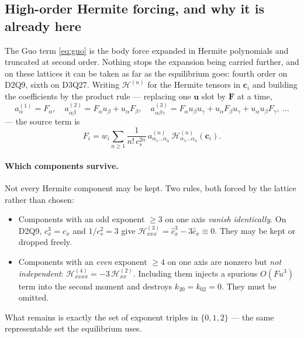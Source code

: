 \documentclass[11pt,a4paper]{article}
\newcommand{\cs}{c_s}
\newcommand{\ci}{\bm{c}_i}
\newcommand{\uu}{\bm{u}}
\begin{document}
\subsection{High-order Hermite forcing, and why it is already here}
\label{sec:hermiteforce}

The Guo term \eqref{eq:guo} is the body force expanded in Hermite polynomials
and truncated at second order. Nothing stops the expansion being carried
further, and on these lattices it can be taken as far as the equilibrium goes:
fourth order on D2Q9, sixth on D3Q27. Writing $\mathcal H^{(n)}$ for the Hermite
tensors in $\ci$ and building the coefficients by the product rule --- replacing
one $\uu$ slot by $\bm F$ at a time,
\begin{equation}
  a^{(1)}_\alpha = F_\alpha, \quad
  a^{(2)}_{\alpha\beta} = F_\alpha u_\beta + u_\alpha F_\beta, \quad
  a^{(3)}_{\alpha\beta\gamma} = F_\alpha u_\beta u_\gamma
    + u_\alpha F_\beta u_\gamma + u_\alpha u_\beta F_\gamma, \ \dots
\end{equation}
--- the source term is
\begin{equation}
  F_i = w_i \sum_{n\ge1} \frac{1}{n!\,\cs^{2n}}\,
        a^{(n)}_{\alpha_1\dots\alpha_n}\,
        \mathcal H^{(n)}_{\alpha_1\dots\alpha_n}(\ci) .
  \label{eq:hermforce}
\end{equation}

\paragraph{Which components survive.} Not every Hermite component may be kept.
Two rules, both forced by the lattice rather than chosen:
\begin{itemize}[leftmargin=1.4em,itemsep=2pt]
\item Components with an odd exponent $\ge3$ on one axis \emph{vanish
      identically}. On D2Q9, $c_x^3 = c_x$ and $1/\cs^2 = 3$ give
      $\mathcal H^{(3)}_{xxx} = \hat c_x^3 - 3\hat c_x \equiv 0$. They may be
      kept or dropped freely.
\item Components with an \emph{even} exponent $\ge4$ on one axis are nonzero but
      \emph{not independent}: $\mathcal H^{(4)}_{xxxx} = -3\,\mathcal
      H^{(2)}_{xx}$. Including them injects a spurious $O(Fu^3)$ term into the
      second moment and destroys $k_{20}=k_{02}=0$. They must be omitted.
\end{itemize}
What remains is exactly the set of exponent triples in $\{0,1,2\}$ --- the same
representable set the equilibrium uses.
\end{document}
